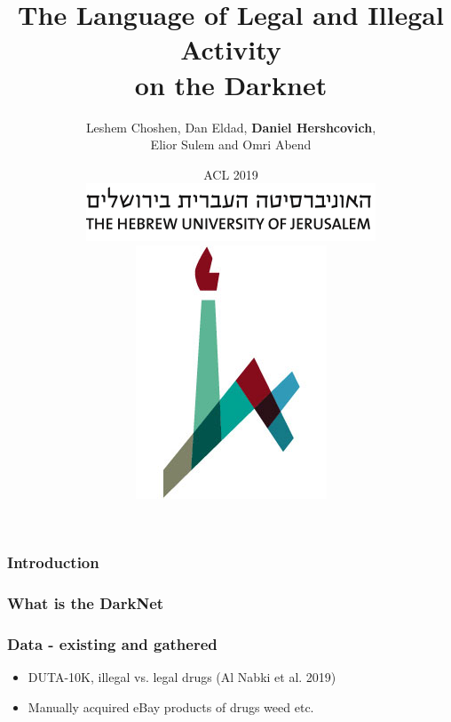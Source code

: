 \documentclass[t,xcolor={svgnames,table}]{beamer}
\begin{document}
\title[]{The Language of Legal and Illegal Activity \\ on the Darknet}
\author[Daniel Hershcovich]{Leshem Choshen, Dan Eldad, \textbf{Daniel Hershcovich}, \\
Elior Sulem and Omri Abend }
\date[]{ACL 2019 \\
	\hspace{0.5cm}
\includegraphics[width=.5\textwidth]{huji_banner.png}
\includegraphics[width=.1\textwidth]{huji_logo.jpg}}

\begin{frame}
\titlepage
\end{frame}

\begin{frame}
\frametitle{Introduction}
\end{frame}

{%
\begin{frame}
	\frametitle{What is the DarkNet}
\end{frame}
}
\begin{frame}
	\frametitle{Data - existing and gathered}
	\begin{itemize}
		\item DUTA-10K, illegal vs. legal drugs (Al Nabki et al. 2019)
		\item Manually acquired eBay products of drugs weed etc.
	\end{itemize}
\end{frame}
\end{document}
